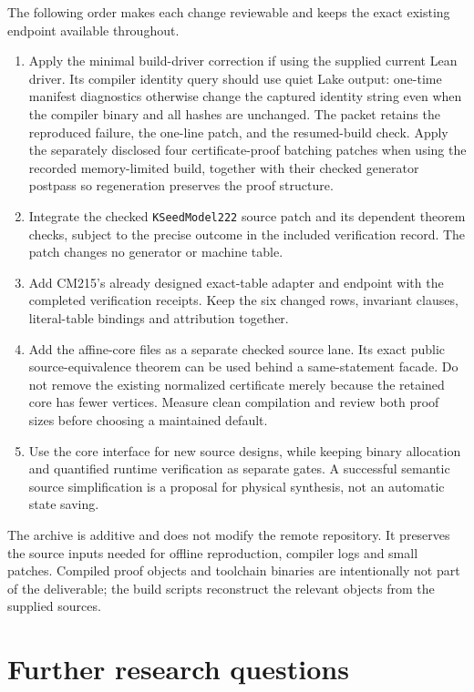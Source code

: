 \documentclass[11pt,letterpaper]{article}
\theoremstyle{definition}\newtheorem{definition}[theorem]{Definition}
\begin{document}
The following order makes each change reviewable and keeps the exact existing
endpoint available throughout.
\begin{enumerate}
\item Apply the minimal build-driver correction if using the supplied current
Lean driver. Its compiler identity query should use quiet Lake output: one-time
manifest diagnostics otherwise change the captured identity string even when
the compiler binary and all hashes are unchanged. The packet retains the
reproduced failure, the one-line patch, and the resumed-build check.
Apply the separately disclosed four certificate-proof batching patches when
using the recorded memory-limited build, together with their checked generator
postpass so regeneration preserves the proof structure.
\item Integrate the checked \texttt{KSeedModel222} source patch and its
dependent theorem checks, subject to the precise outcome in the included
verification record. The patch changes no generator or machine table.
\item Add CM215's already designed exact-table adapter and endpoint with the
completed verification receipts. Keep the six changed rows, invariant clauses,
literal-table bindings and attribution together.
\item Add the affine-core files as a separate checked source lane. Its exact
public source-equivalence theorem can be used behind a same-statement facade.
Do not remove the existing normalized certificate merely because the retained
core has fewer vertices. Measure clean compilation and review both proof sizes
before choosing a maintained default.
\item Use the core interface for new source designs, while keeping binary
allocation and quantified runtime verification as separate gates. A successful
semantic source simplification is a proposal for physical synthesis, not an
automatic state saving.
\end{enumerate}

The archive is additive and does not modify the remote repository. It preserves
the source inputs needed for offline reproduction, compiler logs and small
patches. Compiled proof objects and toolchain binaries are intentionally not
part of the deliverable; the build scripts reconstruct the relevant objects
from the supplied sources.

\section{Further research questions}
\end{document}
